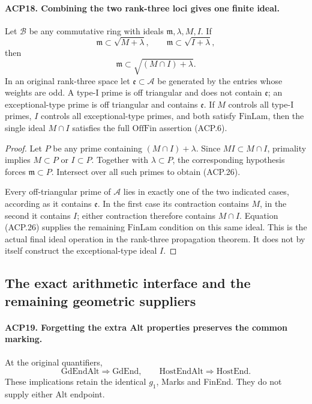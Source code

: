 \documentclass[11pt,a4paper]{article}
\numberwithin{equation}{section}
\theoremstyle{remark}\newtheorem{remark}[theorem]{Remark}
\begin{document}
\paragraph{ACP18. Combining the two rank-three loci gives one finite ideal.}
\label{claim:ACP18}
Let \(\mathcal B\) be any commutative ring with ideals
\(\mathfrak m,\lambda,M,I\).  If
\[
 \mathfrak m\subset\sqrt{M+\lambda},\qquad
 \mathfrak m\subset\sqrt{I+\lambda},
\]
then
\[
                  \mathfrak m\subset\sqrt{(M\cap I)+\lambda}.
                                                        \tag{ACP.26}
\]
In an original rank-three space let
\(\mathfrak e\subset\mathcal A\) be generated by the entries
whose weights are odd.  A type-I prime is off triangular and
does not contain \(\mathfrak e\); an exceptional-type prime
is off triangular and contains \(\mathfrak e\).
If \(M\) controls all type-I primes, \(I\) controls all
exceptional-type primes, and both satisfy \(\mathrm{FinLam}\),
then the single ideal \(M\cap I\) satisfies the full
\(\mathrm{OffFin}\) assertion (ACP.6).

\begin{proof}
Let \(P\) be any prime containing \((M\cap I)+\lambda\).
Since \(MI\subset M\cap I\), primality implies
\(M\subset P\) or \(I\subset P\).  Together with
\(\lambda\subset P\), the corresponding hypothesis forces
\(\mathfrak m\subset P\).  Intersect over all such primes
to obtain (ACP.26).

Every off-triangular prime of \(\mathcal A\) lies in exactly
one of the two indicated cases, according as it contains
\(\mathfrak e\).  In the first case its contraction contains
\(M\), in the second it contains \(I\); either contraction
therefore contains \(M\cap I\).  Equation (ACP.26) supplies
the remaining \(\mathrm{FinLam}\) condition on this same
ideal.  This is the actual final ideal operation in the
rank-three propagation theorem.  It does not by itself
construct the exceptional-type ideal \(I\).
\end{proof}

\subsection{The exact arithmetic interface and the remaining geometric suppliers}

\paragraph{ACP19. Forgetting the extra Alt properties preserves the common marking.}
\label{claim:ACP19}
At the original quantifiers,
\[
 \mathrm{GdEndAlt}\Longrightarrow\mathrm{GdEnd},
 \qquad \mathrm{HostEndAlt}\Longrightarrow\mathrm{HostEnd}.
                                                        \tag{ACP.27}
\]
These implications retain the identical \(g_1\), Marks and
FinEnd.  They do not supply either Alt endpoint.
\end{document}
